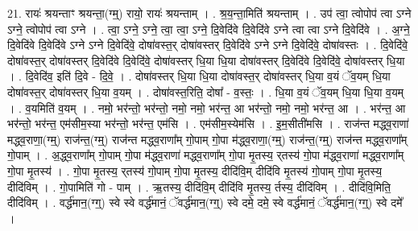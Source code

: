 \documentclass[17pt]{extarticle}
\begin{document}
21. रायः॑ श्रयन्ताꣳ श्रयन्ता॒(ग्म्॒) रायो॒ रायः॑ श्रयन्ताम् । . श्र॒य॒न्ता॒मिति॑ श्रयन्ताम् । . उप॑ त्वा॒ त्वोपोप॑ त्वा ऽग्ने ऽग्ने॒ त्वोपोप॑ त्वा ऽग्ने । . त्वा॒ ऽग्ने॒ ऽग्ने॒ त्वा॒ त्वा॒ ऽग्ने॒ दि॒वेदि॑वे दि॒वेदि॑वे ऽग्ने त्वा त्वा ऽग्ने दि॒वेदि॑वे । . अ॒ग्ने॒ दि॒वेदि॑वे दि॒वेदि॑वे ऽग्ने ऽग्ने दि॒वेदि॑वे॒ दोषा॑वस्त॒र् दोषा॑वस्तर् दि॒वेदि॑वे ऽग्ने ऽग्ने दि॒वेदि॑वे॒ दोषा॑वस्तः । . दि॒वेदि॑वे॒ दोषा॑वस्त॒र् दोषा॑वस्तर् दि॒वेदि॑वे दि॒वेदि॑वे॒ दोषा॑वस्तर् धि॒या धि॒या दोषा॑वस्तर् दि॒वेदि॑वे दि॒वेदि॑वे॒ दोषा॑वस्तर् धि॒या । . दि॒वेदि॑व॒ इति॑ दि॒वे - दि॒वे॒ । . दोषा॑वस्तर् धि॒या धि॒या दोषा॑वस्त॒र् दोषा॑वस्तर् धि॒या व॒यं ॅव॒यम् धि॒या दोषा॑वस्त॒र् दोषा॑वस्तर् धि॒या व॒यम् । . दोषा॑वस्त॒रिति॒ दोषा᳚ - व॒स्तः॒ । . धि॒या व॒यं ॅव॒यम् धि॒या धि॒या व॒यम् । . व॒यमिति॑ व॒यम् । . नमो॒ भर॑न्तो॒ भर॑न्तो॒ नमो॒ नमो॒ भर॑न्त॒ आ भर॑न्तो॒ नमो॒ नमो॒ भर॑न्त॒ आ । . भर॑न्त॒ आ भर॑न्तो॒ भर॑न्त॒ एम॑सीम॒स्या भर॑न्तो॒ भर॑न्त॒ एम॑सि । . एम॑सीम॒स्येम॑सि । . इ॒म॒सीती॑मसि । . राज॑न्त मद्ध्व॒राणा॑ मद्ध्व॒राणा॒(ग्म्॒) राज॑न्त॒(ग्म्॒) राज॑न्त मद्ध्व॒राणा᳚म् गो॒पाम् गो॒पा म॑द्ध्व॒राणा॒(ग्म्॒) राज॑न्त॒(ग्म्॒) राज॑न्त मद्ध्व॒राणा᳚म् गो॒पाम् । . अ॒द्ध्व॒राणा᳚म् गो॒पाम् गो॒पा म॑द्ध्व॒राणा॑ मद्ध्व॒राणा᳚म् गो॒पा मृ॒तस्य॒ र्‌तस्य॑ गो॒पा म॑द्ध्व॒राणा॑ मद्ध्व॒राणा᳚म् गो॒पा मृ॒तस्य॑ । . गो॒पा मृ॒तस्य॒ र्‌तस्य॑ गो॒पाम् गो॒पा मृ॒तस्य॒ दीदि॑वि॒म् दीदि॑वि मृ॒तस्य॑ गो॒पाम् गो॒पा मृ॒तस्य॒ दीदि॑विम् । . गो॒पामिति॑ गो - पाम् । . ऋ॒तस्य॒ दीदि॑वि॒म् दीदि॑वि मृ॒तस्य॒ र्तस्य॒ दीदि॑विम् । . दीदि॑वि॒मिति॒ दीदि॑विम् । . वर्द्ध॑मान॒(ग्ग्॒) स्वे स्वे वर्द्ध॑मानं॒ ॅवर्द्ध॑मान॒(ग्ग्॒) स्वे दमे॒ दमे॒ स्वे वर्द्ध॑मानं॒ ॅवर्द्ध॑मान॒(ग्ग्॒) स्वे दमे᳚ । \newline
\end{document}
